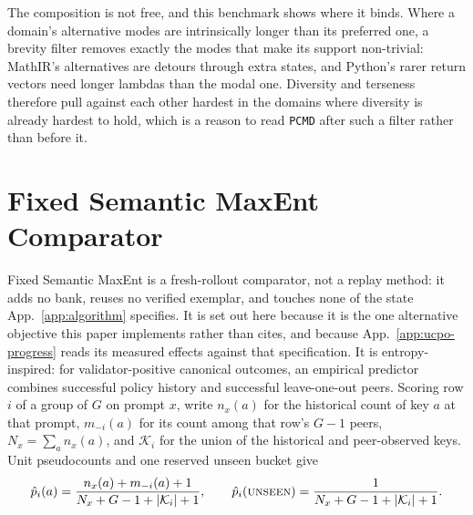 \documentclass{article}
\newcommand{\1}{\mathbf 1}
\newcommand{\pmd}{\texttt{PCMD}}
\theoremstyle{remark}
\theoremstyle{definition}
\theoremstyle{plain}
\begin{document}
The composition is not free, and this benchmark shows where it binds. Where a
domain's alternative modes are intrinsically longer than its preferred one, a
brevity filter removes exactly the modes that make its support non-trivial:
MathIR's alternatives are detours through extra states, and Python's rarer
return vectors
need longer lambdas than the modal one. Diversity and terseness therefore pull
against each other hardest in the domains where diversity is already hardest to
hold, which is a reason to read \pmd{} after such a filter rather than before
it.

\section{Fixed Semantic MaxEnt Comparator}
\label{app:semantic-maxent}

Fixed Semantic MaxEnt is a fresh-rollout comparator, not a replay method: it
adds no bank, reuses no verified exemplar, and touches none of the state
App.~\ref{app:algorithm} specifies. It is set out here because it is the one
alternative objective this paper implements rather than cites, and because
App.~\ref{app:ucpo-progress} reads its measured effects against that
specification. It is entropy-inspired: for validator-positive canonical
outcomes, an empirical predictor combines successful policy history and
successful leave-one-out peers. Scoring row $i$ of a group of $G$ on prompt
$x$, write $n_x(a)$ for the historical count of key $a$ at that prompt,
$m_{-i}(a)$ for its count among that row's $G-1$ peers,
$N_x=\sum_a n_x(a)$, and $\mathcal K_i$ for the union of the historical and
peer-observed keys. Unit pseudocounts and one reserved unseen bucket give
\begin{equation}
  \hat p_i(a)=\frac{n_x(a)+m_{-i}(a)+1}{N_x+G-1+|\mathcal K_i|+1},\qquad
  \hat p_i(\textsc{unseen})=\frac{1}{N_x+G-1+|\mathcal K_i|+1}.
  \label{eq:open-set-predictor}
\end{equation}
\end{document}
